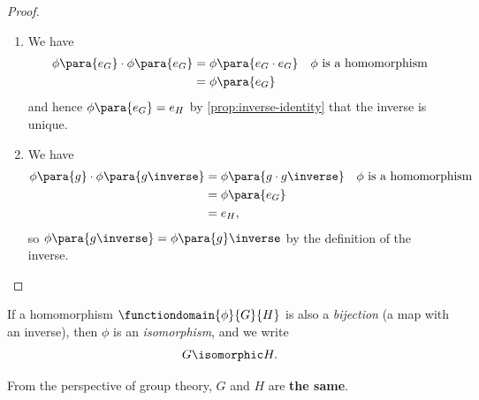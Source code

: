 \begin{proof}
    \begin{enumerate}
        \item We have
        \begin{align*}
            \phi\para{e_G} \cdot \phi\para{e_G} &= \phi\para{e_G \cdot e_G} && \phi \text{ is a homomorphism} \\
            &= \phi\para{e_G}
        \end{align*}
        and hence \(\phi\para{e_G} = e_H\) by \autoref{prop:inverse-identity} that the inverse is unique.

        \item We have
        \begin{align*}
            \phi\para{g} \cdot \phi\para{g \inverse} &= \phi\para{g \cdot g\inverse} && \phi \text{ is a homomorphism} \\
            &= \phi\para{e_G} \\
            &= e_H,
        \end{align*}
        so \(\phi\para{g \inverse} = \phi\para{g}\inverse\) by the definition of the inverse.
    \end{enumerate}
\end{proof}

\begin{definition}[Isomorphism]
    \label{def:isomorphism}%
    If a homomorphism \(\functiondomain{\phi}{G}{H}\) is also a \emph{bijection} (a map with an inverse), then \(\phi\) is an \emph{isomorphism}, and we write
    \[
        G \isomorphic H. 
    \]
\end{definition}

From the perspective of group theory, \(G\) and \(H\) are \textbf{the same}.

